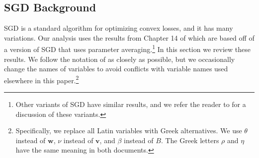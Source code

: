 \documentclass[twoside]{article}
\newcommand{\vv}{\mathbf v}
\newcommand{\w}{\mathbf w}
\newcommand{\ignore}[1]{}
\begin{document}
\ignore{
\subsection{Summary}

It is well known that when using the standard cross entropy loss,
SGD converges at a rate of $O(\sqrt{k/n})$.
The tree loss's parameter sharing scheme asymptotically improves this convergence rate.

We assume that the class labels have a metric structure and let $c$ denote the doubling dimension of this metric.
This $c$ is a measure of the difficulty of our problem,
with larger $c$ implying more complex metrics and a more difficult learning problem.
This is captured in our convergence rates,
which show show that the tree loss converges at a rate of $O(\sqrt{\log k/n})$ for $c\le1$ or $O(\sqrt{k^{1-1/c}/n})$ for $c>1$.

But what happens if the tree is poorly constructed?
Remarkably, nothing bad.
We also show that for arbitrarily bad label tree structures,
the $U$ and $V$ losses maintain a $O(\sqrt{k/n})$ convergence rate.
This suggests that there is essentially no downside to using the tree loss parameterizations.

Our analysis relies on standard properties of stochastic gradient descent.
In this section, we first review these results,
then we formally state and prove our main result.
}

\subsection{SGD Background}

SGD is a standard algorithm for optimizing convex losses,
and it has many variations.
Our analysis uses the results from Chapter 14 of \citet{shalev2014understanding} which are based off of a version of SGD that uses parameter averaging.\footnote{
Other variants of SGD have similar results,
and we refer the reader to \citet{shalev2014understanding} for a discussion of these variants.}
In this section we review these results.
We follow the notation of \citet{shalev2014understanding} as closely as possible,
but we occasionally change the names of variables to avoid conflicts with variable names used elsewhere in this paper.\footnote{
    Specifically, we replace all Latin variables with Greek alternatives.
    We use $\theta$ instead of $\w$, $\nu$ instead of $\vv$, and $\beta$ instead of $B$.
    The Greek letters $\rho$ and $\eta$ have the same meaning in both documents.
}
\end{document}
